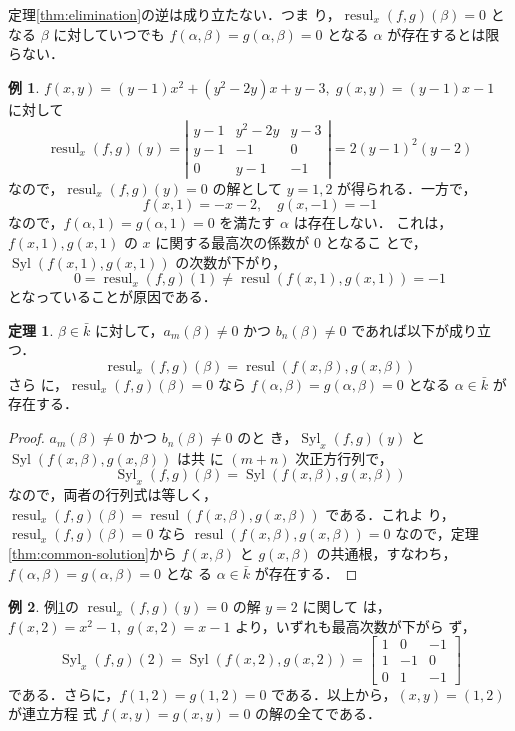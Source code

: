 \documentclass[12pt, uplatex, dvipdfmx]{jsarticle}
\theoremstyle{definition}
\newtheorem{theorem}{定理}
\newtheorem{example}{例}
\DeclareMathOperator{\Syl}{Syl}
\DeclareMathOperator{\resul}{resul}
\begin{document}
定理\ref{thm:elimination}の逆は成り立たない．つま
り，$\resul_x(f,g)(\beta)=0$ となる $\beta$ に対していつでも
$f(\alpha, \beta)=g(\alpha, \beta)=0$ となる $\alpha$ が存在するとは限
らない．

\begin{example}\label{exmp:degenerate}
  $f(x,y)=(y-1)x^2 + (y^2-2y)x + y-3, \; g(x,y) = (y-1)x-1$ に対して
  \[
    \resul_x(f,g)(y) = \left|
      \begin{array}{ccc}
        y-1 & y^2-2y & y-3\\
        y-1 & -1 & 0\\
        0 & y-1 & -1
      \end{array}
    \right| = 2(y-1)^2(y-2)
  \]
  なので，$\resul_x(f,g)(y)=0$ の解として $y=1,2$ が得られる．一方で，
  \[
    f(x,1) = -x-2, \quad g(x,-1)=-1
  \]
  なので，$f(\alpha,1)=g(\alpha,1)=0$ を満たす $\alpha$ は存在しない．
  これは，$f(x,1),g(x,1)$ の $x$ に関する最高次の係数が $0$ となるこ
  とで，$\Syl(f(x,1), g(x,1))$ の次数が下がり，
  \[
    0=\resul_x(f,g)(1) \neq \resul(f(x,1), g(x,1))=-1
  \]
  となっていることが原因である．
\end{example}

\begin{theorem}\label{thm:extention1}
  $\beta \in \bar{k}$ に対して，$a_m(\beta) \neq 0$ かつ $b_n(\beta) \neq 0$ であれば以下が成り立つ．
  \[
    \resul_x(f,g)(\beta) = \resul(f(x,\beta), g(x,\beta))
  \]
  さら
  に，$\resul_x(f,g)(\beta)=0$ なら $f(\alpha,\beta)=g(\alpha,\beta)=0$
  となる $\alpha \in \bar{k}$ が存在する．
\end{theorem}

\begin{proof}
  $a_m(\beta) \neq 0$ かつ $b_n(\beta)\neq 0$ のと
  き，$\Syl_x(f,g)(y)$ と $\Syl(f(x,\beta), g(x,\beta))$ は共
  に $(m+n)$ 次正方行列で，
  \[
    \Syl_x(f,g)(\beta) = \Syl(f(x,\beta), g(x, \beta))
  \]
  なので，両者の行列式は等しく，$\resul_x(f,g)(\beta) =
  \resul(f(x,\beta), g(x,\beta))$ である．これよ
  り，$\resul_x(f,g)(\beta)=0$ なら $\resul(f(x,\beta), g(x,\beta))=0$
  なので，定理\ref{thm:common-solution}から $f(x,\beta)$ と $g(x,
  \beta)$ の共通根，すなわち，$f(\alpha,\beta)=g(\alpha,\beta)=0$ とな
  る $\alpha \in \bar{k}$ が存在する．
\end{proof}

\begin{example}
  例\ref{exmp:degenerate}の $\resul_x(f,g)(y)=0$ の解 $y=2$ に関して
  は，$f(x,2)=x^2-1, \; g(x,2)=x-1$ より，いずれも最高次数が下がら
  ず，
  \[
    \Syl_x(f,g)(2)= \Syl(f(x,2), g(x,2))=\left[
      \begin{array}{rrr}
        1 & 0 & -1\\
        1 & -1 & 0\\
        0 & 1 & -1
      \end{array}
    \right]
  \]
  である．さらに，$f(1,2)=g(1,2)=0$ である．以上から，$(x,y)=(1,2)$ が連立方程
  式 $f(x,y)=g(x,y)=0$ の解の全てである．
\end{example}
\end{document}

